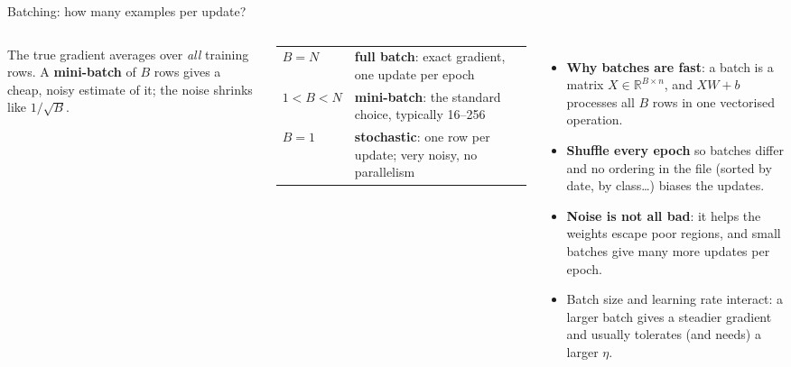 \documentclass[aspectratio=169,10pt]{beamer}
\newcommand{\R}{\mathbb{R}}
\newcommand{\key}[1]{\textbf{\color{cAtt}#1}}
\begin{document}
\begin{frame}{Batching: how many examples per update?}
\begin{columns}[T,onlytextwidth]
\small
The true gradient averages over \emph{all} training rows. A \key{mini-batch} of $B$ rows gives a
cheap, noisy estimate of it; the noise shrinks like $1/\sqrt B$.

\vspace{1mm}
{\footnotesize
\renewcommand{\arraystretch}{1.2}
\begin{tabular}{@{}lp{58mm}@{}}
\toprule
$B=N$ & \textbf{full batch}: exact gradient, one update per epoch\\
$1<B<N$ & \textbf{mini-batch}: the standard choice, typically 16--256\\
$B=1$ & \textbf{stochastic}: one row per update; very noisy, no parallelism\\
\bottomrule
\end{tabular}}

\vspace{2mm}
\begin{itemize}\footnotesize
  \item \textbf{Why batches are fast}: a batch is a matrix $X\in\R^{B\times n}$, and $XW+b$
        processes all $B$ rows in one vectorised operation.
  \item \textbf{Shuffle every epoch} so batches differ and no ordering in the file (sorted by
        date, by class\dots) biases the updates.
  \item \textbf{Noise is not all bad}: it helps the weights escape poor regions, and small
        batches give many more updates per epoch.
  \item Batch size and learning rate interact: a larger batch gives a steadier gradient and
        usually tolerates (and needs) a larger $\eta$.
\end{itemize}
\centering
{}


\end{columns}
\end{frame}
\end{document}
